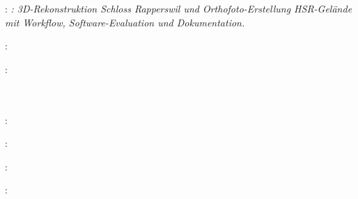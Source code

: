 
\thispagestyle{empty}

\hfill

\vfill

\noindent\myName: \textit{\myTitle: 3D-Rekonstruktion Schloss Rapperswil und
Orthofoto-Erstellung HSR-Gelände mit Workflow, Software-Evaluation und
Dokumentation.}
\textcopyright\ \myTime

\bigskip

\noindent{}: \\
\myHackerspace

\medskip

\noindent{}: \\
\myUni \\
\myFaculty \\
\myProf

\medskip

\noindent{}: \\
\myLocation

\medskip

\noindent{}: \\
\myTime

\medskip

\noindent{}: \\
\myLicense

\medskip

\noindent{}: \\
\myRepo
